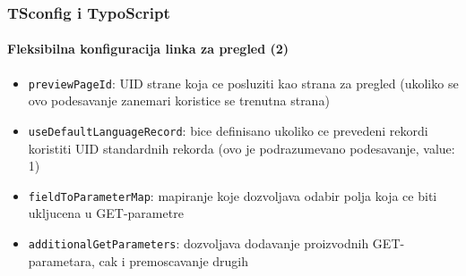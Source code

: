 \begin{frame}[fragile]
	\frametitle{TSconfig i TypoScript}
	\framesubtitle{Fleksibilna konfiguracija linka za pregled (2)}

	\begin{itemize}
		\item \texttt{previewPageId}:\newline
			\smaller
				UID strane koja ce posluziti kao strana za pregled\newline
				(ukoliko se ovo podesavanje zanemari koristice se trenutna strana)
			\normalsize
		\item \texttt{useDefaultLanguageRecord}:\newline
			\smaller
				bice definisano ukoliko ce prevedeni rekordi koristiti UID standardnih rekorda\newline
				(ovo je podrazumevano podesavanje, value: 1)
			\normalsize
		\item \texttt{fieldToParameterMap}:\newline
			\smaller
				mapiranje koje dozvoljava odabir polja koja ce biti ukljucena u GET-parametre
			\normalsize
		\item \texttt{additionalGetParameters}:\newline
			\smaller
				dozvoljava dodavanje proizvodnih GET-parametara, cak i premoscavanje drugih
			\normalsize
	\end{itemize}

\end{frame}

